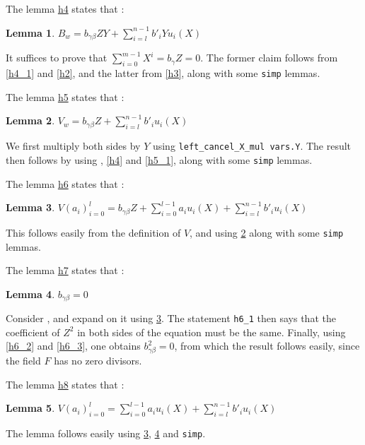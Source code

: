 \documentclass{article}
\newtheorem{lemma}{Lemma}
\theoremstyle{definition}
\theoremstyle{remark}
\begin{document}
The lemma \href{https://github.com/BoltonBailey/formal-snarks-project/blob/7fd9cd122f5887f88f6a706b4f2a68a7153c7381/src/snarks/babysnark/knowledge_soundness.lean#L381}{h4} states that :
\theoremstyle{lemma} \label{h4}
\begin{lemma}
  $B_w = b_{\gamma \beta} ZY + \sum_{i = l}^{n - 1} b'_i Y u_i(X) $
\end{lemma}
It suffices to prove that $\sum_{i = 0}^{m - 1} X^i = b_{\gamma}Z = 0$. The former claim follows from \ref{h4_1} and \ref{h2}, and the latter from \ref{h3}, along with some \texttt{simp} lemmas.

The lemma \href{https://github.com/BoltonBailey/formal-snarks-project/blob/7fd9cd122f5887f88f6a706b4f2a68a7153c7381/src/snarks/babysnark/knowledge_soundness.lean#L387}{h5} states that :
\theoremstyle{lemma}
\begin{lemma} \label{h5}
  $V_w = b_{\gamma \beta} Z + \sum_{i = l}^{n - 1} b'_i u_i(X) $
\end{lemma}
We first multiply both sides by $Y$ using \texttt{left\_cancel\_X\_mul vars.Y}. The result then follows by using , \ref{h4} and \ref{h5_1}, along with some \texttt{simp} lemmas.

The lemma \href{https://github.com/BoltonBailey/formal-snarks-project/blob/7fd9cd122f5887f88f6a706b4f2a68a7153c7381/src/snarks/babysnark/knowledge_soundness.lean#L399}{h6} states that :
\theoremstyle{lemma}
\begin{lemma} \label{h6}
  $V (a_i)_{i = 0}^{l} = b_{\gamma \beta} Z + \sum_{i = 0}^{l - 1} a_i u_i(X) + \sum_{i = l}^{n - 1} b'_i u_i(X) $
\end{lemma}
This follows easily from the definition of $V$, and using \ref{h5} along with some \texttt{simp} lemmas.

The lemma \href{https://github.com/BoltonBailey/formal-snarks-project/blob/7fd9cd122f5887f88f6a706b4f2a68a7153c7381/src/snarks/babysnark/knowledge_soundness.lean#L411}{h7} states that :
\theoremstyle{lemma}
\begin{lemma} \label{h7}
  $b_{\gamma \beta} = 0$
\end{lemma}
Consider , and expand on it using \ref{h6}. The statement \texttt{h6\_1} then says that the coefficient of $Z^2$ in both sides of the equation must be the same. Finally, 
using \ref{h6_2} and \ref{h6_3}, one obtains $b_{\gamma \beta}^2 = 0$, from which the result follows easily, since the field $F$ has no zero divisors. 

The lemma \href{https://github.com/BoltonBailey/formal-snarks-project/blob/7fd9cd122f5887f88f6a706b4f2a68a7153c7381/src/snarks/babysnark/knowledge_soundness.lean#L419}{h8} states that :
\theoremstyle{lemma}
\begin{lemma} \label{h8}
  $V (a_i)_{i = 0}^{l} = \sum_{i = 0}^{l - 1} a_i u_i(X) + \sum_{i = l}^{n - 1} b'_i u_i(X) $
\end{lemma}
The lemma follows easily using \ref{h6}, \ref{h7} and \texttt{simp}.
\end{document}
